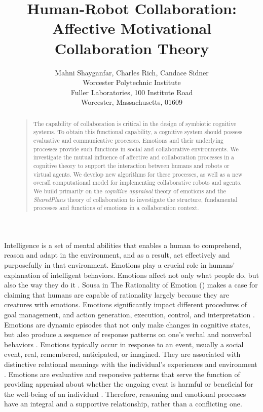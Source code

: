 \documentclass[letterpaper]{article}
\begin{document}
%
\title{Human-Robot Collaboration: Affective Motivational Collaboration Theory}
\author{Mahni Shayganfar, Charles Rich, Candace Sidner\\
Worcester Polytechnic Institute\\
Fuller Laboratories, 100 Institute Road\\
Worcester, Massachusetts, 01609\\
}
\maketitle
\begin{abstract}
\begin{quote}
The capability of collaboration is critical in the design of symbiotic cognitive
systems. To obtain this functional capability, a cognitive system should possess
evaluative and communicative processes. Emotions and their underlying processes
provide such functions in social and collaborative environments. We investigate
the mutual influence of affective and collaboration processes in a cognitive
theory to support the interaction between humans and robots or virtual agents.
We develop new algorithms for these processes, as well as a new overall
computational model for implementing collaborative robots and agents. We build
primarily on the \textit{cognitive appraisal} theory of emotions and the
\textit{SharedPlans} theory of collaboration to investigate the structure,
fundamental processes and functions of emotions in a collaboration context.
\end{quote}
\end{abstract}

Intelligence is a set of mental abilities that enables a human to comprehend,
reason and adapt in the environment, and as a result, act effectively and
purposefully in that environment. Emotions play a crucial role in humans'
explanation of intelligent behaviors. Emotions affect not only what people do,
but also the way they do it \cite{cowie:concepts-definitions}. Sousa in The
Rationality of Emotion (\citeyear{sousa:rationality-emotion}) makes a case for
claiming that humans are capable of rationality largely because they are
creatures with emotions. Emotions significantly impact different procedures of
goal management, and action generation, execution, control, and interpretation
\cite{zhu:emotion-action}. Emotions are dynamic episodes that not only make
changes in cognitive states, but also produce a sequence of response patterns on
one's verbal and nonverbal behaviors \cite{scherer:expression-appraisal}.
Emotions typically occur in response to an event, usually a social event, real,
remembered, anticipated, or imagined. They are associated with distinctive
relational meanings with the individual's experiences and environment
\cite{parkinson:holds-emotion}. Emotions are evaluative and responsive patterns
that serve the function of providing appraisal about whether the ongoing event
is harmful or beneficial for the well-being of an individual
\cite{zhu:emotion-action}. Therefore, reasoning and emotional processes have an
integral and a supportive relationship, rather than a conflicting one.
\end{document}
